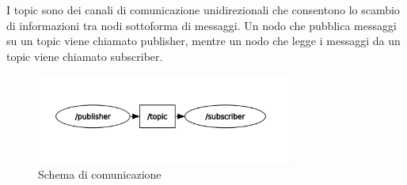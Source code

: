 I topic sono dei canali di comunicazione unidirezionali che consentono lo scambio di informazioni tra nodi sottoforma di 
messaggi. Un nodo che pubblica messaggi su un topic viene chiamato publisher, mentre un nodo che legge i messaggi da un topic 
viene chiamato subscriber.
\begin{figure}[H]
    \centering
    \includegraphics*[width=0.75\textwidth]{images/topic_graph.png}
    \caption{Schema di comunicazione}
    \label{fig:topic_graph}
\end{figure}